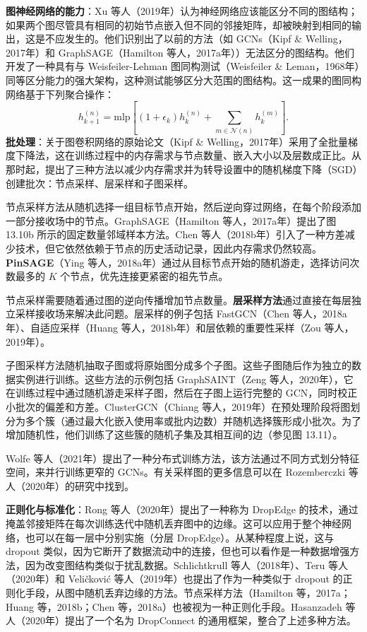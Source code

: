 \textbf{图神经网络的能力}：Xu 等人（2019年）认为神经网络应该能区分不同的图结构；如果两个图尽管具有相同的初始节点嵌入但不同的邻接矩阵，却被映射到相同的输出，这是不应发生的。他们识别出了以前的方法（如 GCNs（Kipf \& Welling，2017年）和 GraphSAGE（Hamilton 等人，2017a年））无法区分的图结构。他们开发了一种具有与 Weisfeiler-Lehman 图同构测试（Weisfeiler \& Leman，1968年）同等区分能力的强大架构，这种测试能够区分大范围的图结构。这一成果的图同构网络基于下列聚合操作：
\[
h^{(n)}_{k+1} = \text{mlp} \left[ \left(1 + \epsilon_k\right) h^{(n)}_k + \sum_{m\in\mathcal{N}(n)} h^{(m)}_k \right]. \tag{13.26}
\]
\textbf{批处理}：关于图卷积网络的原始论文（Kipf \& Welling，2017年）采用了全批量梯度下降法，这在训练过程中的内存需求与节点数量、嵌入大小以及层数成正比。从那时起，提出了三种方法以减少内存需求并为转导设置中的随机梯度下降（SGD）创建批次：节点采样、层采样和子图采样。

节点采样方法从随机选择一组目标节点开始，然后逆向穿过网络，在每个阶段添加一部分接收场中的节点。GraphSAGE（Hamilton 等人，2017a年）提出了图 13.10b 所示的固定数量邻域样本方法。Chen 等人（2018b年）引入了一种方差减少技术，但它依然依赖于节点的历史活动记录，因此内存需求仍然较高。\textbf{PinSAGE}（Ying 等人，2018a年）通过从目标节点开始的随机游走，选择访问次数最多的 \(K\) 个节点，优先连接更紧密的祖先节点。

节点采样需要随着通过图的逆向传播增加节点数量。\textbf{层采样方法}通过直接在每层独立采样接收场来解决此问题。层采样的例子包括 FastGCN（Chen 等人，2018a年）、自适应采样（Huang 等人，2018b年）和层依赖的重要性采样（Zou 等人，2019年）。

子图采样方法随机抽取子图或将原始图分成多个子图。这些子图随后作为独立的数据实例进行训练。这些方法的示例包括 GraphSAINT（Zeng 等人，2020年），它在训练过程中通过随机游走采样子图，然后在子图上运行完整的 GCN，同时校正小批次的偏差和方差。ClusterGCN（Chiang 等人，2019年）在预处理阶段将图划分为多个簇（通过最大化嵌入使用率或批内边数）并随机选择簇形成小批次。为了增加随机性，他们训练了这些簇的随机子集及其相互间的边（参见图 13.11）。

Wolfe 等人（2021年）提出了一种分布式训练方法，该方法通过不同方式划分特征空间，来并行训练更窄的 GCNs。有关采样图的更多信息可以在 Rozemberczki 等人（2020年）的研究中找到。

\textbf{正则化与标准化}：Rong 等人（2020年）提出了一种称为 DropEdge 的技术，通过掩盖邻接矩阵在每次训练迭代中随机丢弃图中的边缘。这可以应用于整个神经网络，也可以在每一层中分别实施（分层 DropEdge）。从某种程度上说，这与 dropout 类似，因为它断开了数据流动中的连接，但也可以看作是一种数据增强方法，因为改变图结构类似于扰乱数据。Schlichtkrull 等人（2018年）、Teru 等人（2020年）和 Veličković 等人（2019年）也提出了作为一种类似于 dropout 的正则化手段，从图中随机丢弃边缘的方法。节点采样方法（Hamilton 等，2017a；Huang 等，2018b；Chen 等，2018a）也被视为一种正则化手段。Hasanzadeh 等人（2020年）提出了一个名为 DropConnect 的通用框架，整合了上述多种方法。

